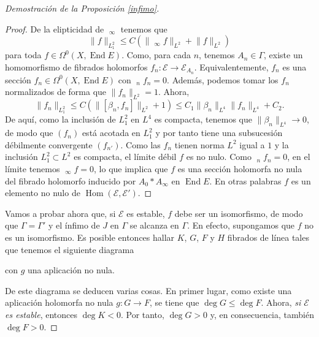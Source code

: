 \documentclass[12pt, a4paper]{amsart}
\newcommand\EE{\mathscr{E}}
\DeclareMathOperator\Hom{Hom}
\DeclareMathOperator\End{End}
\DeclareMathOperator\delbar{\bar{\partial}}
\theoremstyle{remark} \newtheorem{rmk}[thm]{Observación}
\theoremstyle{remark} \newtheorem{rmks}[thm]{Observaciones}
\theoremstyle{definition} \newtheorem{defn}[thm]{Definición}
\theoremstyle{definition} \newtheorem{ejs}[thm]{Ejemplos}
\theoremstyle{definition} \newtheorem{ej}[thm]{Ejemplo}
\begin{document}
\begin{proof}[Demostración de la Proposición \ref{infimo}]
\begin{proof}
	De la elipticidad de $\delbar_\infty$ tenemos que
	 \begin{equation*}
		 \lVert f \rVert_{L^2_1} \leq C(\lVert \delbar_\infty f\rVert_{L^2}+\lVert f \rVert_{L^2})
	\end{equation*} 
	para toda $f\in \Omega^0(X,\End E)$. Como, para cada $n$, tenemos $A_n \in \Gamma$, existe un homomorfismo de fibrados holomorfos $f_n:\EE \rightarrow \EE_{A_n}$. Equivalentemente, $f_n$ es una sección  $f_n \in \Omega^0(X,\End E)$ con $\delbar_n f_n=0$. Además, podemos tomar los $f_n$ normalizados de forma que $\lVert f_n \rVert_{L^2}=1$. Ahora,
	 \begin{equation*}
		 \lVert f_n \rVert_{L^2_1} \leq C(\lVert [\beta_n,f_n]\rVert_{L^2}+1) \leq C_1 \lVert \beta_n \rVert_{L^4}\lVert f_n \rVert_{L^4} + C_2.
	\end{equation*} 
	De aquí, como la inclusión de $L^{2}_1$ en $L^4$ es compacta, tenemos que $\lVert \beta_n \rVert_{L^4} \rightarrow 0$, de modo que  $(f_n)$ está acotada en $L^2_1$ y por tanto tiene una subsucesión débilmente convergente $(f_{n'})$. Como las $f_n$ tienen norma  $L^2$ igual a  $1$ y la inclusión  $L^2_1\subset L^2$ es compacta, el límite débil $f$ es no nulo. Como $\delbar_n f_n=0$, en el límite tenemos $\delbar_\infty f=0$, lo que implica que $f$ es una sección holomorfa no nula del fibrado holomorfo inducido por $A_0*A_\infty$ en $\End E$. En otras palabras $f$ es un elemento no nulo de $\Hom(\EE,\EE')$.
\end{proof}

Vamos a probar ahora que, si $\EE$ es estable, $f$ debe ser un isomorfismo, de modo que $\Gamma=\Gamma'$ y el ínfimo de $J$ en $\Gamma$ se alcanza en $\Gamma$. En efecto, supongamos que $f$ no es un isomorfismo. Es posible entonces hallar $K$, $G$, $F$ y $H$ fibrados de línea tales que tenemos el siguiente diagrama \cite[p. 547]{NS} 
\begin{center}
\end{center}
con $g$ una aplicación no nula.

De este diagrama se deducen varias cosas. En primer lugar, como existe una aplicación holomorfa no nula $g:G\rightarrow F$, se tiene que  $\deg G \leq \deg F$. Ahora, \emph{si $\EE$ es estable}, entonces $\deg K < 0$. Por tanto,  $\deg G > 0$ y, en consecuencia, también  $\deg F >0$.


\end{proof}
\end{document}
